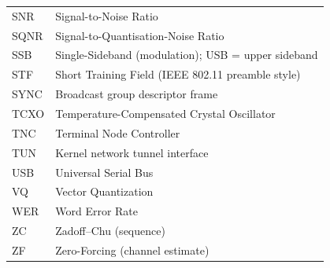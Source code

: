 \begin{longtable}{@{}p{3.0cm}p{11.4cm}@{}}
SNR    & Signal-to-Noise Ratio \\
SQNR   & Signal-to-Quantisation-Noise Ratio \\
SSB    & Single-Sideband (modulation); USB = upper sideband \\
STF    & Short Training Field (IEEE 802.11 preamble style) \\
SYNC   & Broadcast group descriptor frame \\
TCXO   & Temperature-Compensated Crystal Oscillator \\
TNC    & Terminal Node Controller \\
TUN    & Kernel network tunnel interface \\
USB    & Universal Serial Bus \\
VQ     & Vector Quantization \\
WER    & Word Error Rate \\
ZC     & Zadoff--Chu (sequence) \\
ZF     & Zero-Forcing (channel estimate) \\
\bottomrule
\end{longtable}
\addtocounter{table}{-1}

\newpage
